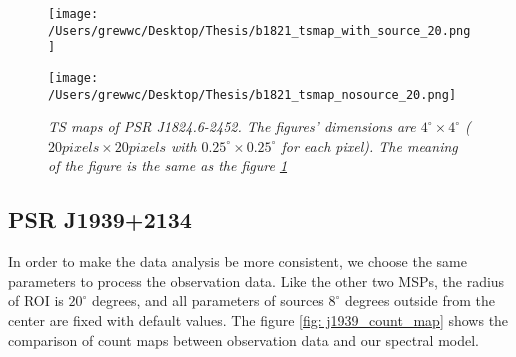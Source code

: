 \documentclass[12pt]{report}
\newcommand{\mycaption}[1]{\caption{\textit{\footnotesize #1}}}
\begin{document}
            \begin{figure}[!ht]
              \begin{center}
              \begin{minipage}{0.45\textwidth}
                \begin{center} 
                  \texttt{[image: /Users/grewwc/Desktop/Thesis/b1821\_tsmap\_with\_source\_20.png]}
                \end{center}
              \end{minipage}
              \begin{minipage}{0.45\textwidth}
                \begin{center}
                  \texttt{[image: /Users/grewwc/Desktop/Thesis/b1821\_tsmap\_nosource\_20.png]}
                \end{center}
              \end{minipage}
            \end{center}

              \centering
              \begin{minipage}{\textwidth}
                \mycaption{TS maps of PSR J1824.6-2452. The figures' dimensions are $4^{\circ} \times4^{\circ}$ ($20 pixels \times 
                20 pixels$ with $0.25^{\circ} \times 0.25^{\circ}$ for each pixel). The meaning of the 
                figure is the same as the figure \ref{fig: b1821_tsmap_comparison_15}}
                \label{fig: b1821_tsmap_comparison_15}
              \end{minipage}
            \end{figure}
            \vspace{1cm}
      
        \subsection{PSR J1939+2134}
          In order to make the data analysis be more consistent, we choose the same parameters
          to process the observation data. Like the other two MSPs, the radius of ROI is $20^{\circ}$ 
          degrees, and all parameters of sources $8^{\circ}$ degrees outside from the center 
          are fixed with default values. The figure \ref{fig: j1939_count_map} shows the 
          comparison of count maps between observation data and our spectral model. 
\end{document}
